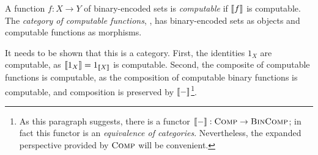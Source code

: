 \begin{dfn}
  A function $f: X\to Y$ of binary-encoded sets is \emph{computable} if
  $\llbracket f \rrbracket$ is computable. The \emph{category of computable functions},
  , has binary-encoded sets as objects and computable functions as
  morphisms.
\end{dfn}

It needs to be shown that this is a category. First, the identities
$1_X$ are computable, as $\llbracket 1_X \rrbracket = 1_{\llbracket X \rrbracket}$ is computable. Second,
the composite of computable functions is computable, as the composition of
computable binary functions is computable, and composition is preserved by
$\llbracket - \rrbracket$\footnote{
  As this paragraph suggests, there is a functor $\llbracket - \rrbracket:
  {\textsc{\text{Comp}}}\to{\textsc{\text{BinComp}}}$; in fact this functor is an \emph{equivalence of
  categories}. Nevertheless, the expanded perspective provided by ${\textsc{\text{Comp}}}$ will be
  convenient.
}.




